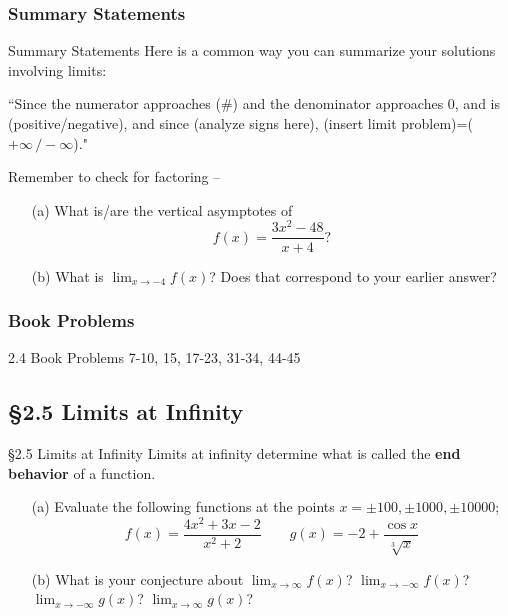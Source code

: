 \documentclass[cal1spr16Lectures.tex]{subfiles}
\begin{document}
\subsubsection{Summary Statements}
\begin{frame}{\small Summary Statements}
Here is a common way you can summarize your solutions involving limits:

\vspace{1pc}
``Since the numerator approaches \alert{(\#)} and the denominator approaches $0$, and is \alert{(positive/negative)}, and since \alert{(analyze signs here)}, \alert{(insert limit problem)}=\alert{($+\infty\,/-\infty$)}."
\end{frame}

\begin{frame}
Remember to check for factoring -- 

\begin{exe} \begin{itemize}
\item[(a)] What is/are the vertical asymptotes of 
\[f(x)=\frac{3x^2-48}{x+4} ?\]
\item[(b)] What is $\displaystyle\lim_{x \to -4} f(x)$?  Does that correspond to your earlier answer?
\end{itemize}
\end{exe}
\end{frame}

\subsubsection{Book Problems}
\begin{frame}
\begin{block}{2.4 Book Problems} 7-10, 15, 17-23, 31-34, 44-45 \end{block}
\end{frame}

\subsection[2.5 Limits at Infinity]{\S 2.5 Limits at Infinity}

\begin{frame}{\S 2.5 Limits at Infinity}\footnotesize
Limits at infinity determine what is called the {\bf end behavior} of a function.
\begin{exe}
\begin{itemize}
\item[(a) ]Evaluate the following functions at the points $x=\pm100,\pm1000,\pm10000$;
\[f(x)=\frac{4x^2+3x-2}{x^2+2}\qquad g(x)=-2+\frac{\cos{x}}{\sqrt[3]{x}}
\]
\item[(b) ] What is your conjecture about $\lim_{x\to\infty}f(x)$?  $\lim_{x\to-\infty}f(x)$?  $\lim_{x\to-\infty}g(x)$?  $\lim_{x\to\infty}g(x)$?
\end{itemize}
\end{exe}
\end{frame}
\end{document}

